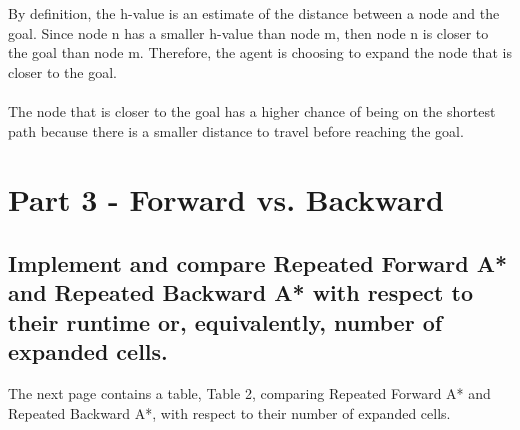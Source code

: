 \documentclass{article}
\begin{document}
By definition, the h-value is an estimate of the distance between a node and the goal. Since node n has a smaller h-value than node m, then node n is closer to the goal than node m. Therefore, the agent is choosing to expand the node that is closer to the goal.\\\\
The node that is closer to the goal has a higher chance of being on the shortest path because there is a smaller distance to travel before reaching the goal.




\section{Part 3 - Forward vs. Backward}


\subsection{Implement and compare Repeated Forward A* and Repeated Backward A* with respect to their runtime or, equivalently, number of expanded cells. }
The next page contains a table, Table 2, comparing Repeated Forward A* and Repeated Backward A*, with respect to their number of expanded cells.\\
\end{document}

